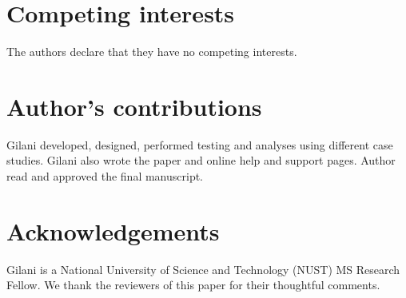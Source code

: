 \documentclass[twocolumn]{bmcart}%
\begin{document}

\begin{backmatter}

\section*{Competing interests}
  The authors declare that they have no competing interests.

\section*{Author's contributions}
  Gilani developed, designed, performed testing and analyses using different case studies. Gilani also wrote the paper and online help and support pages. Author read and approved the final manuscript.

\section*{Acknowledgements}
  Gilani is a National University of Science and Technology (NUST) MS Research Fellow. We thank the reviewers of this paper for their thoughtful comments.




\end{backmatter}
\end{document}
